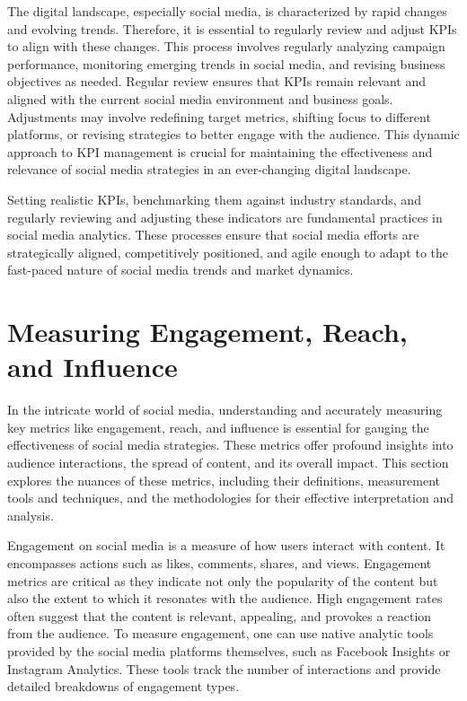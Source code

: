 \documentclass[
]{book}
\begin{document}
The digital landscape, especially social media, is characterized by rapid changes and evolving trends. Therefore, it is essential to regularly review and adjust KPIs to align with these changes. This process involves regularly analyzing campaign performance, monitoring emerging trends in social media, and revising business objectives as needed. Regular review ensures that KPIs remain relevant and aligned with the current social media environment and business goals. Adjustments may involve redefining target metrics, shifting focus to different platforms, or revising strategies to better engage with the audience. This dynamic approach to KPI management is crucial for maintaining the effectiveness and relevance of social media strategies in an ever-changing digital landscape.

Setting realistic KPIs, benchmarking them against industry standards, and regularly reviewing and adjusting these indicators are fundamental practices in social media analytics. These processes ensure that social media efforts are strategically aligned, competitively positioned, and agile enough to adapt to the fast-paced nature of social media trends and market dynamics.

\hypertarget{measuring-engagement-reach-and-influence}{%
\section*{Measuring Engagement, Reach, and Influence}\label{measuring-engagement-reach-and-influence}}

In the intricate world of social media, understanding and accurately measuring key metrics like engagement, reach, and influence is essential for gauging the effectiveness of social media strategies. These metrics offer profound insights into audience interactions, the spread of content, and its overall impact. This section explores the nuances of these metrics, including their definitions, measurement tools and techniques, and the methodologies for their effective interpretation and analysis.

Engagement on social media is a measure of how users interact with content. It encompasses actions such as likes, comments, shares, and views. Engagement metrics are critical as they indicate not only the popularity of the content but also the extent to which it resonates with the audience. High engagement rates often suggest that the content is relevant, appealing, and provokes a reaction from the audience. To measure engagement, one can use native analytic tools provided by the social media platforms themselves, such as Facebook Insights or Instagram Analytics. These tools track the number of interactions and provide detailed breakdowns of engagement types.
\end{document}
